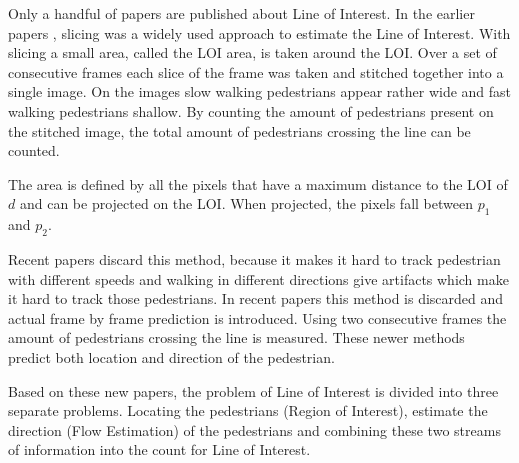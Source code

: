 Only a handful of papers are published about Line of Interest. In the earlier papers \cite{ma_counting_2016, cao_large_2015}, slicing was a widely used approach to estimate the Line of Interest. With slicing a small area, called the LOI area, is taken around the LOI. Over a set of consecutive frames each slice of the frame was taken and stitched together into a single image. On the images slow walking pedestrians appear rather wide and fast walking pedestrians shallow. By counting the amount of pedestrians present on the stitched image, the total amount of pedestrians crossing the line can be counted.

The area is defined by all the pixels that have a maximum distance to the LOI of $d$ and can be projected on the LOI. When projected, the pixels fall between $p_1$ and $p_2$.

Recent papers discard this method, because it makes it hard to track pedestrian with different speeds and walking in different directions give artifacts which make it hard to track those pedestrians. In recent papers this method is discarded and actual frame by frame prediction is introduced. Using two consecutive frames the amount of pedestrians crossing the line is measured. These newer methods predict both location and direction of the pedestrian. 

Based on these new papers, the problem of Line of Interest is divided into three separate problems. Locating the pedestrians (Region of Interest), estimate the direction (Flow Estimation) of the pedestrians and combining these two streams of information into the count for Line of Interest.